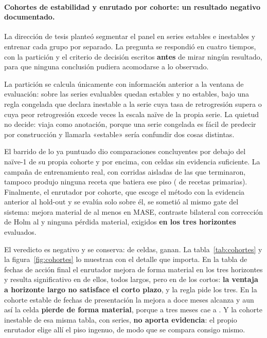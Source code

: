 \documentclass[12pt,letterpaper]{report}
\begin{document}
\paragraph{Cohortes de estabilidad y enrutado por cohorte: un resultado negativo documentado.}
La dirección de tesis planteó segmentar el panel en series estables e inestables y entrenar cada
grupo por separado. La pregunta se respondió en cuatro tiempos, con la partición y el criterio de
decisión escritos \textbf{antes} de mirar ningún resultado, para que ninguna conclusión pudiera
acomodarse a lo observado.

La partición se calcula únicamente con información anterior a la ventana de evaluación: sobre las
\cohortFactNSeriesEvaluable{} series evaluables quedan \cohortFactNEstable{} estables y
\cohortFactNNoEstable{} no estables, bajo una regla congelada que declara inestable a la serie
cuya tasa de retrogresión supera \cohortFactRetroRateMax{} o cuya peor retrogresión excede
\cohortFactWorstRetroScaledMax{} veces la escala naïve de la propia serie. La quietud no decide:
viaja como anotación, porque una serie congelada es fácil de predecir por construcción y llamarla
«estable» sería confundir dos cosas distintas.

El barrido de lo ya puntuado dio \cohortFactScanPeor{} comparaciones concluyentes por debajo del
naïve-1 de su propia cohorte y \cohortFactScanBate{} por encima, con
\cohortFactScanSinDatos{} celdas sin evidencia suficiente. La campaña de entrenamiento real, con
\cohortFactCampanaLanes{} corridas aisladas de las que \cohortFactCampanaOk{} terminaron,
tampoco produjo ninguna receta que batiera ese piso (\cohortFactCampanaBate{} de
\cohortFactCampanaPrimarias{} recetas primarias). Finalmente, el enrutador por cohorte, que
escoge el método con la evidencia anterior al hold-out y se evalúa solo sobre él, se sometió al
mismo gate del sistema: mejora material de al menos \cohortFactRouterMargen{} en MASE, contraste
bilateral con corrección de Holm al \cohortFactRouterAlfa{} y ninguna pérdida material, exigidos
\textbf{en los tres horizontes} evaluados.

El veredicto es negativo y se conserva: de \cohortFactRouterCeldas{} celdas,
\cohortFactRouterGana{} ganan. La tabla~\ref{tab:cohortes} y la figura~\ref{fig:cohortes} lo
muestran con el detalle que importa. En la tabla de fechas de acción final el enrutador mejora de
forma material en los tres horizontes y resulta significativo en
\cohortFactRouterFadLargosSignificativos{} de ellos, todos largos, pero en
\cohortFactRouterFadCortosSignificativos{} de los cortos: \textbf{la ventaja a horizonte largo no
satisface el corto plazo}, y la regla pide los tres. En la cohorte estable de fechas de
presentación la mejora a doce meses alcanza \cohortFactRouterDffEstableMejorHDoce{} y aun así la
celda \textbf{pierde de forma material}, porque a tres meses cae a
\cohortFactRouterDffEstablePeorHTres{}. Y la cohorte inestable de esa misma tabla, con
\cohortFactRouterDffNoEstableN{} series, \textbf{no aporta evidencia}: el propio enrutador elige
allí el piso ingenuo, de modo que se compara consigo mismo.
\end{document}
